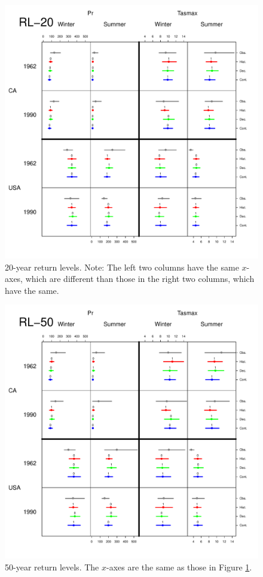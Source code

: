 \begin{figure}
\begin{center}
 \includegraphics[scale=0.72]{figs/rl20.pdf}
\end{center}
\caption{20-year return levels. Note: The left two columns have the same $x$-axes, which are different than those in the right two columns, which have the same.}
\label{20rl}
\end{figure}

\begin{figure}
\begin{center}
 \includegraphics[scale=0.72]{figs/rl50.pdf}
\end{center}
\caption{50-year return levels. The $x$-axes are the same as those in Figure \ref{20rl}.}
\label{50rl}
\end{figure}

